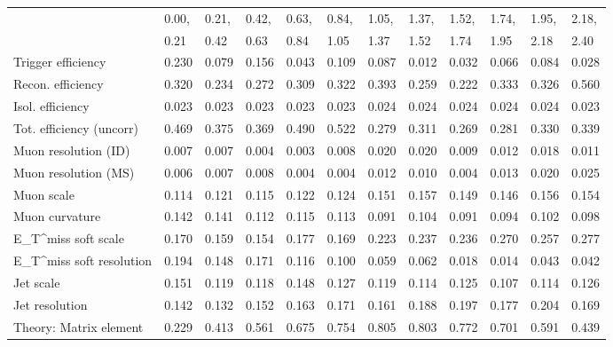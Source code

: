 \begin{tabular}{l|p{0.6cm}p{0.6cm}p{0.6cm}p{0.6cm}p{0.6cm}p{0.6cm}p{0.6cm}p{0.6cm}p{0.6cm}p{0.6cm}p{0.6cm}}
\hline
   & 0.00, & 0.21, & 0.42, & 0.63, & 0.84, & 1.05, & 1.37, & 1.52, & 1.74, & 1.95, & 2.18,  \\ 
   & 0.21 & 0.42 & 0.63 & 0.84 & 1.05 & 1.37 & 1.52 & 1.74 & 1.95 & 2.18 & 2.40  \\ 
\hline
Trigger efficiency                       & 0.230 & 0.079 & 0.156 & 0.043 & 0.109 & 0.087 & 0.012 & 0.032 & 0.066 & 0.084 & 0.028 \\
Recon. efficiency                        & 0.320 & 0.234 & 0.272 & 0.309 & 0.322 & 0.393 & 0.259 & 0.222 & 0.333 & 0.326 & 0.560 \\
Isol. efficiency                         & 0.023 & 0.023 & 0.023 & 0.023 & 0.023 & 0.024 & 0.024 & 0.024 & 0.024 & 0.024 & 0.023 \\
Tot. efficiency (uncorr)                 & 0.469 & 0.375 & 0.369 & 0.490 & 0.522 & 0.279 & 0.311 & 0.269 & 0.281 & 0.330 & 0.339 \\
Muon resolution (ID)                     & 0.007 & 0.007 & 0.004 & 0.003 & 0.008 & 0.020 & 0.020 & 0.009 & 0.012 & 0.018 & 0.011 \\
Muon resolution (MS)                     & 0.006 & 0.007 & 0.008 & 0.004 & 0.004 & 0.012 & 0.010 & 0.004 & 0.013 & 0.020 & 0.025 \\
Muon scale                               & 0.114 & 0.121 & 0.115 & 0.122 & 0.124 & 0.151 & 0.157 & 0.149 & 0.146 & 0.156 & 0.154 \\
Muon curvature                           & 0.142 & 0.141 & 0.112 & 0.115 & 0.113 & 0.091 & 0.104 & 0.091 & 0.094 & 0.102 & 0.098 \\
E_{T}^{miss} soft scale                  & 0.170 & 0.159 & 0.154 & 0.177 & 0.169 & 0.223 & 0.237 & 0.236 & 0.270 & 0.257 & 0.277 \\
E_{T}^{miss} soft resolution             & 0.194 & 0.148 & 0.171 & 0.116 & 0.100 & 0.059 & 0.062 & 0.018 & 0.014 & 0.043 & 0.042 \\
Jet scale                                & 0.151 & 0.119 & 0.118 & 0.148 & 0.127 & 0.119 & 0.114 & 0.125 & 0.107 & 0.114 & 0.126 \\
Jet resolution                           & 0.142 & 0.132 & 0.152 & 0.163 & 0.171 & 0.161 & 0.188 & 0.197 & 0.177 & 0.204 & 0.169 \\
Theory: Matrix element                   & 0.229 & 0.413 & 0.561 & 0.675 & 0.754 & 0.805 & 0.803 & 0.772 & 0.701 & 0.591 & 0.439 \\

\end{tabular}
